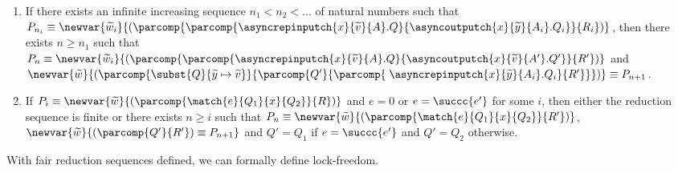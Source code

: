 \begin{defi}
\begin{enumerate}
        \item If there exists an infinite increasing sequence $n_1 < n_2 < ...$ of natural numbers such that $P_{n_i} \equiv \newvar{\widetilde{w}_i}{(\parcomp{\parcomp{\asyncrepinputch{x}{\widetilde{v}}{A}.Q}{\asyncoutputch{x}{\widetilde{y}}{A_i}.Q_i}}{R_i})}$, then there exists $n \geq n_1$ such that $P_n \equiv \newvar{\widetilde{w}_i}{(\parcomp{\parcomp{\asyncrepinputch{x}{\widetilde{v}}{A}.Q}{\asyncoutputch{x}{\widetilde{v}}{A'}.Q'}}{R'})}$ and $\newvar{\widetilde{w}}{(\parcomp{\subst{Q}{\widetilde{y} \mapsto \widetilde{v}}}{\parcomp{Q'}{\parcomp{\;\asyncrepinputch{x}{\widetilde{y}}{A_i}.Q_i}{R'}}})} \equiv P_{n+1}$.
        
        \item If $P_i \equiv \newvar{\widetilde{w}}{(\parcomp{\match{e}{Q_1}{x}{Q_2}}{R})}$ and $e = 0$ or $e = \succc{e'}$ for some $i$, then either the reduction sequence is finite or there exists $n \geq i$ such that $P_n \equiv \newvar{\widetilde{w}}{(\parcomp{\match{e}{Q_1}{x}{Q_2}}{R'})}$, $\newvar{\widetilde{w}}{(\parcomp{Q'}{R'}) \equiv P_{n+1}}$ and $Q' = Q_1$ if $e = \succc{e'}$ and $Q' = Q_2$ otherwise.
    \end{enumerate}
    \label{def:lockfreedomfair}
\end{defi}

With fair reduction sequences defined, we can formally define lock-freedom.

